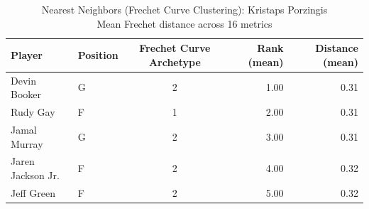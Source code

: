 \begin{table}[t]
\caption*{
{\fontsize{20}{25} Nearest Neighbors (Frechet Curve Clustering): Kristaps Porzingis\fontsize{12}{15}\selectfont } \\ 
{\fontsize{14}{17}\selectfont  Mean Frechet distance across 16 metrics\fontsize{12}{15}\selectfont }
} 
\fontsize{12.0pt}{14.0pt}\selectfont
\begin{tabular*}{\linewidth}{@{\extracolsep{\fill}}llcrr}
\toprule
Player & Position & Frechet Curve Archetype & Rank (mean) & Distance (mean) \\ 
\midrule\addlinespace[2.5pt]
Devin Booker & G & 2 & 1.00 & 0.31 \\ 
Rudy Gay & F & 1 & 2.00 & 0.31 \\ 
Jamal Murray & G & 2 & 3.00 & 0.31 \\ 
Jaren Jackson Jr. & F & 2 & 4.00 & 0.32 \\ 
Jeff Green & F & 2 & 5.00 & 0.32 \\ 
\bottomrule
\end{tabular*}
\end{table}

